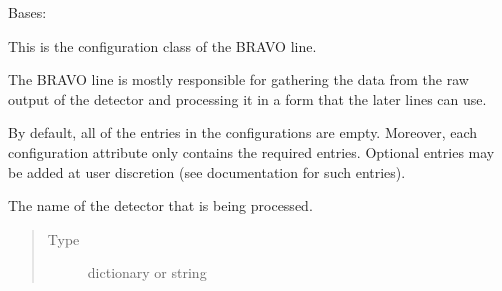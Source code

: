 \documentclass[letterpaper,10pt,english]{sphinxmanual}
\begin{document}
\begin{fulllineitems}
\label{\detokenize{python_docstrings/IfA_Smeargle.yankee.configuration_classes.BravoConfig_file:IfA_Smeargle.yankee.configuration_classes.BravoConfig_file.BravoConfig}}
Bases: {\hyperref[\detokenize{python_docstrings/IfA_Smeargle.yankee.configuration_classes.BaseConfig_file:IfA_Smeargle.yankee.configuration_classes.BaseConfig_file.BaseConfig}]{}}

This is the configuration class of the BRAVO line.

The BRAVO line is mostly responsible for gathering the data from the
raw output of the detector and processing it in a form that the later
lines can use.

By default, all of the entries in the configurations are empty. Moreover,
each configuration attribute only contains the required entries. Optional
entries may be added at user discretion (see documentation for such
entries).

\begin{fulllineitems}
\label{\detokenize{python_docstrings/IfA_Smeargle.yankee.configuration_classes.BravoConfig_file:IfA_Smeargle.yankee.configuration_classes.BravoConfig_file.BravoConfig.detector_name}}
The name of the detector that is being processed.
\begin{quote}\begin{description}
\item[{Type}] \leavevmode
dictionary or string

\end{description}\end{quote}

\end{fulllineitems}



\end{fulllineitems}
\end{document}
